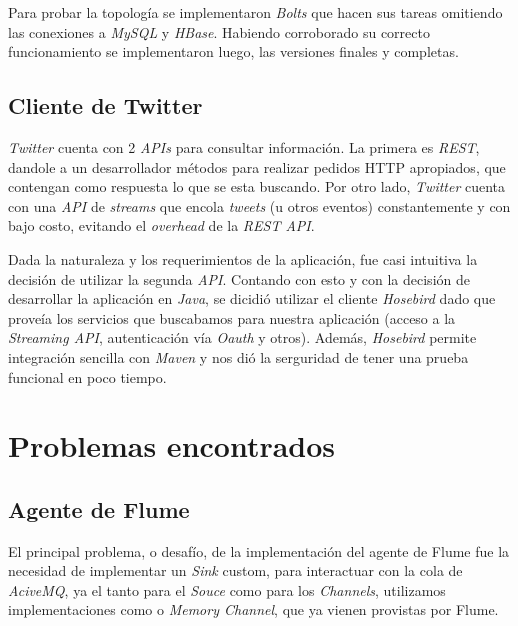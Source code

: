 \documentclass[a4paper,10pt]{article}
\begin{document}
Para probar la topología se implementaron \textit{Bolts} que hacen sus tareas omitiendo las conexiones a \textit{MySQL} y \textit{HBase}.
Habiendo corroborado su correcto funcionamiento se implementaron luego, las versiones finales y completas.

\subsection{Cliente de Twitter}

\textit{Twitter} cuenta con 2 \textit{APIs} para consultar información. La primera es \textit{REST}, dandole a un desarrollador métodos para realizar pedidos HTTP apropiados,
que contengan como respuesta lo que se esta buscando. Por otro lado, \textit{Twitter} cuenta con una \textit{API} de \textit{streams} que encola \textit{tweets} (u otros eventos)
constantemente y con bajo costo, evitando el \textit{overhead} de la \textit{REST API}.

Dada la naturaleza y los requerimientos de la aplicación, fue casi intuitiva la decisión de utilizar la segunda \textit{API}. Contando con esto y con la decisión de desarrollar
la aplicación en \textit{Java}, se dicidió utilizar el cliente \textit{Hosebird} dado que proveía los servicios que buscabamos para nuestra aplicación (acceso a la
\textit{Streaming API}, autenticación vía \textit{Oauth} y otros). Además, \textit{Hosebird} permite integración sencilla con \textit{Maven} y nos dió la serguridad de tener
una prueba funcional en poco tiempo.

\section{Problemas encontrados}

\subsection{Agente de Flume}
El principal problema, o desafío, de la implementación del agente de Flume fue la necesidad de implementar un \textit{Sink} custom, para interactuar con la cola
de \textit{AciveMQ}, ya el tanto para el \textit{Souce} como para los \textit{Channels}, utilizamos implementaciones como  o \textit{Memory Channel},
que ya vienen provistas por Flume.
\end{document}

